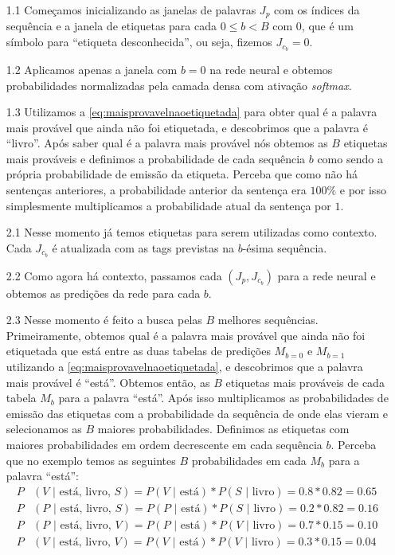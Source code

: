 \begin{itemize}

\item[1.1] Começamos inicializando as janelas de palavras $J_p$ com os índices da sequência e a janela de etiquetas para cada $0 \leq b < B$ com $0$, que é um símbolo para ``etiqueta desconhecida'', ou seja, fizemos $J_{c_b} = 0$.

\item[1.2] Aplicamos apenas a janela com $b=0$ na rede neural e obtemos probabilidades normalizadas pela camada densa com ativação \textit{softmax}. 

\item[1.3] Utilizamos a \autoref{eq:maisprovavelnaoetiquetada} para obter qual é a palavra mais provável que ainda não foi etiquetada, e descobrimos que a palavra é ``livro''. Após saber qual é a palavra mais provável nós obtemos as $B$ etiquetas mais prováveis e definimos a probabilidade de cada sequência $b$ como sendo a própria probabilidade de emissão da etiqueta. Perceba que como não há sentenças anteriores, a probabilidade anterior da sentença era $100\%$ e por isso simplesmente multiplicamos a probabilidade atual da sentença por $1$. 

\item[2.1] Nesse momento já temos etiquetas para serem utilizadas como contexto. Cada $J_{c_b}$ é atualizada com as tags previstas na $b$-ésima sequência.

\item[2.2] Como agora há contexto, passamos cada $(J_p, J_{c_b})$ para a rede neural e obtemos as predições da rede para cada $b$.

\item[2.3] Nesse momento é feito a busca pelas $B$ melhores sequências. Primeiramente, obtemos qual é a palavra mais provável que ainda não foi etiquetada que está entre as duas tabelas de predições $M_{b=0}$ e $M_{b=1}$ utilizando a \autoref{eq:maisprovavelnaoetiquetada}, e descobrimos que a palavra mais provável é ``está''. Obtemos então, as $B$ etiquetas mais prováveis de cada tabela $M_b$ para a palavra ``está''. Após isso multiplicamos as probabilidades de emissão das etiquetas com a probabilidade da sequência de onde elas vieram e selecionamos as $B$ maiores probabilidades. Definimos as etiquetas com maiores probabilidades em ordem decrescente em cada sequência $b$. Perceba que no exemplo temos as seguintes $B$ probabilidades em cada $M_b$ para a palavra ``está'': 
\begin{align*}
P&(V \mbox{ | está, livro, } S) = P(V \mbox{ | está}) * P(S \mbox{ | livro}) = 0.8 * 0.82 = 0.65 \nonumber \\ 
P&(P \mbox{ | está, livro, } S) = P(P \mbox{ | está}) * P(S \mbox{ | livro}) = 0.2 * 0.82 = 0.16 \nonumber \\ 
P&(P \mbox{ | está, livro, } V) = P(P \mbox{ | está}) * P(V \mbox{ | livro}) = 0.7 * 0.15 = 0.10 \nonumber \\ 
P&(V \mbox{ | está, livro, } V) = P(V \mbox{ | está}) * P(V \mbox{ | livro}) = 0.3 * 0.15 = 0.04 \nonumber
\end{align*}


\end{itemize}
